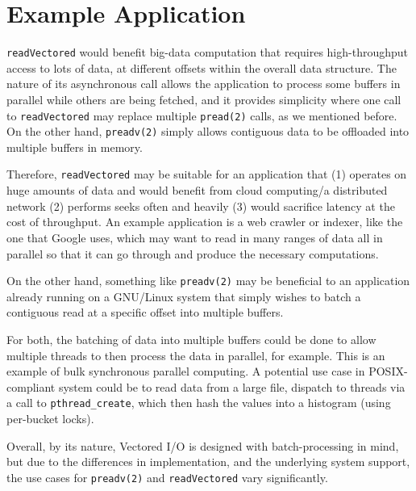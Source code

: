 \documentclass[letterpaper,twocolumn]{article}
\begin{document}
\section{Example Application}

\texttt{readVectored} would benefit big-data computation that requires high-throughput access to lots of data, at different offsets within the overall data structure. The nature of its asynchronous call allows the application to process some buffers in parallel while others are being fetched, and it provides simplicity where one call to \texttt{readVectored} may replace multiple \texttt{pread(2)} calls, as we mentioned before. On the other hand, \texttt{preadv(2)} simply allows contiguous data to be offloaded into multiple buffers in memory.

Therefore, \texttt{readVectored} may be suitable for an application that (1) operates on huge amounts of data and would benefit from cloud computing/a distributed network (2) performs seeks often and heavily (3) would sacrifice latency at the cost of throughput. An example application is a web crawler or indexer, like the one that Google uses, which may want to read in many ranges of data all in parallel so that it can go through and produce the necessary computations.

On the other hand, something like \texttt{preadv(2)} may be beneficial to an application already running on a GNU/Linux system that simply wishes to batch a contiguous read at a specific offset into multiple buffers. 

For both, the batching of data into multiple buffers could be done to allow multiple threads to then process the data in parallel, for example. This is an example of bulk synchronous parallel computing. A potential use case in POSIX-compliant system could be to read data from a large file, dispatch to threads via a call to \texttt{pthread\_create}, which then hash the values into a histogram (using per-bucket locks). 

Overall, by its nature, Vectored I/O is designed with batch-processing in mind, but due to the differences in implementation, and the underlying system support, the use cases for \texttt{preadv(2)} and \texttt{readVectored} vary significantly.
\printbibliography

\end{document}
